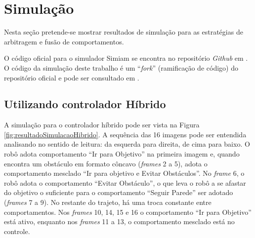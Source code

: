 	
	
	
	
\section{Simulação}

	Nesta seção pretende-se mostrar resultados de simulação para as estratégias de 
	arbitragem e fusão de comportamentos. 
	
	O código oficial para o simulador Simiam se encontra no repositório \textit{Github}
	em . O código da simulação deste trabalho 
	é um ``\textit{fork}'' (ramificação de código) do repositório oficial e pode ser 
	consultado em .
	
	\subsection{Utilizando controlador Híbrido}
	
	A simulação para o controlador híbrido pode ser vista na Figura \ref{fig:resultadoSimulacaoHibrido}. 
	A sequência das 16 imagens pode ser entendida analisando no sentido de leitura: da esquerda para direita, de 
	cima para baixo. O robô adota comportamento ``Ir para Objetivo'' na primeira imagem e, quando encontra um
	obstáculo em formato côncavo (\textit{frames} 2 a 5), adota o comportamento mesclado ``Ir para objetivo e 
	Evitar Obstáculos''. No \textit{frame} 6, o robô adota o comportamento ``Evitar Obstáculo'', o que leva o robô
	a se afastar do objetivo o suficiente para o comportamento ``Seguir Parede'' ser adotado (\textit{frames} 7
	a 9). No restante do trajeto, há uma troca constante entre comportamentos. Nos \textit{frames} 10, 14, 15 e 16
	o comportamento ``Ir para Objetivo'' está ativo, enquanto nos \textit{frames} 11 a 13, o comportamento 
	mesclado está no controle.
	
	
	
